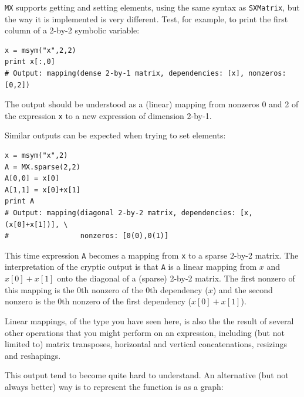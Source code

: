 \documentclass[a4paper,12pt]{book}
\begin{document}
{\texttt{MX} supports getting and setting elements, using the same syntax as \texttt{SXMatrix}, but the way it is implemented is very different. Test, for example, to print the first column of a 2-by-2 symbolic variable:
\begin{verbatim}
x = msym("x",2,2)
print x[:,0] 
# Output: mapping(dense 2-by-1 matrix, dependencies: [x], nonzeros: [0,2])
\end{verbatim}

The output should be understood as a (linear) mapping from nonzeros 0 and 2 of the expression \texttt{x} to a new expression of dimension 2-by-1.

Similar outputs can be expected when trying to set elements:
\begin{verbatim}
x = msym("x",2)
A = MX.sparse(2,2)
A[0,0] = x[0]
A[1,1] = x[0]+x[1]
print A
# Output: mapping(diagonal 2-by-2 matrix, dependencies: [x,(x[0]+x[1])], \
#                 nonzeros: [0(0),0(1)]
\end{verbatim}
This time expression \texttt{A} becomes a mapping from \texttt{x} to a sparse 2-by-2 matrix. The interpretation of the cryptic output is that \texttt{A} is a linear mapping from $x$ and $x[0]+x[1]$ onto the diagonal of a (sparse) 2-by-2 matrix. The first nonzero of this mapping is the 0th nonzero of the 0th dependency ($x$) and the second nonzero is the 0th nonzero of the first dependency ($x[0]+x[1]$). 

Linear mappings, of the type you have seen here, is also the the result of several other operations that you might perform on an expression, including (but not limited to) matrix transposes, horizontal and vertical concatenations, resizings and reshapings.

This output tend to become quite hard to understand. An alternative (but not always better) way is to represent the function is as a graph:

}
\end{document}

